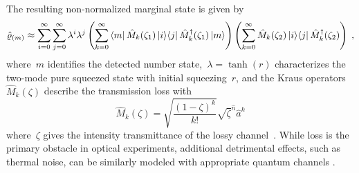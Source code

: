 \documentclass{article}
\begin{document}
The resulting non-normalized marginal state is given by
%
\begin{equation}\label{e-pnr-rho}
  \hatrho_{(m)} \approx
  \sum_{i = 0}^{\infty} 
  \sum_{j = 0}^{\infty}
    \lambda^{i} \lambda^{j}
    \left(
      \sum_{k = 0}^{\infty}
        \bra{m} \hat{M}_{k} (\zeta_{1}) \ketbra{i}{j} \hat{M}_{k}^{\dagger} (\zeta_{1}) \ket{m}
    \right)
    \left(
      \sum_{k = 0}^{\infty}
        \hat{M}_{k}(\zeta_{2}) \ketbra{i}{j} \hat{M}_{k}^{\dagger} (\zeta_{2})
    \right) \Qc
\end{equation}
%
where~$m$ identifies the detected number state,~${\lambda = \tanh(r)}$ characterizes the two-mode pure squeezed state with initial squeezing~$r$, and the Kraus operators~${\hat{M}_{k} (\zeta)}$ describe the transmission loss with
%
\begin{equation}
  \hat{M}_{k} (\zeta) =
    \sqrt{ \frac{(1 - \zeta)^{k}}{k!} } 
    \sqrt{\zeta}^{\hat{n}} \hat{a}^{k}
\end{equation}
%
where~$\zeta$ gives the intensity transmittance of the lossy channel~\cite{ivan2011}. While loss is the primary obstacle in optical experiments, additional detrimental effects, such as thermal noise, can be similarly modeled with appropriate quantum channels \cite{ivan2011,gagatsos2017}.
\end{document}
